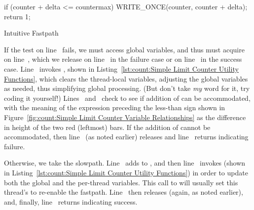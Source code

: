 \begin{listing}
\begin{VerbatimL}[firstnumber=3]
	if (counter + delta <= countermax) {
		WRITE_ONCE(counter, counter + delta);
		return 1;
	}
\end{VerbatimL}
\caption{Intuitive Fastpath}
\label{lst:count:Intuitive Fastpath}
\end{listing}

\QuickQuizEnd

\begin{fcvref}
If the test on
line~ fails, we must access global variables, and thus
must acquire  on
line~, which we release on line~
in the failure case or on line~ in the success case.
Line~ invokes , shown in
Listing~\ref{lst:count:Simple Limit Counter Utility Functions},
which clears the thread-local variables, adjusting the global variables
as needed, thus simplifying global processing.
(But don't take \emph{my} word for it, try coding it yourself!)
Lines~ and~ check to see
if addition of  can be accommodated,
with the meaning of the expression preceding the less-than sign shown in
Figure~\ref{fig:count:Simple Limit Counter Variable Relationships}
as the difference in height of the two red (leftmost) bars.
If the addition of  cannot be accommodated, then
line~ (as noted earlier) releases  and
line~
returns indicating failure.

Otherwise, we take the slowpath.
Line~ adds  to , and then
line~ invokes  (shown in
Listing~\ref{lst:count:Simple Limit Counter Utility Functions})
in order to update both the global and the per-thread variables.
This call to 
will usually set this thread's  to re-enable the fastpath.
Line~ then releases
 (again, as noted earlier), and, finally,
line~ returns indicating success.
\end{fcvref}

